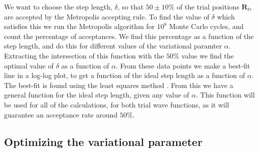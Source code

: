 \documentclass[%
 reprint,
nofootinbib,
aps,
]{revtex4-1}
\begin{document}
We want to choose the step length, $\delta$, so that $50 \pm 10 \%$ of the trial positions $\bm{R}_{tr}$ are accepted by the Metropolis accepting rule. To find the value of $\delta$ which satisfies this we run the Metropolis algorithm for $10^8$ Monte Carlo cycles, and count the percentage of acceptances. We find this percentage as a function of the step length, and do this for different values of the variational paramter $\alpha$. Extracting the intersection of this function with the $50\%$ value we find the optimal value of $\delta$ as a function of $\alpha$. From these data points we make a best-fit line in a log-log plot, to get a function of the ideal step length as a function of $\alpha$. The best-fit is found using the least squares method \cite{squires}. From this we have a general function for the ideal step length, given any value of $\alpha$. This function will be used for all of the calculations, for both trial wave functions, as it will guarantee an acceptance rate around $50\%$.


\subsection{Optimizing the variational parameter}
\end{document}

